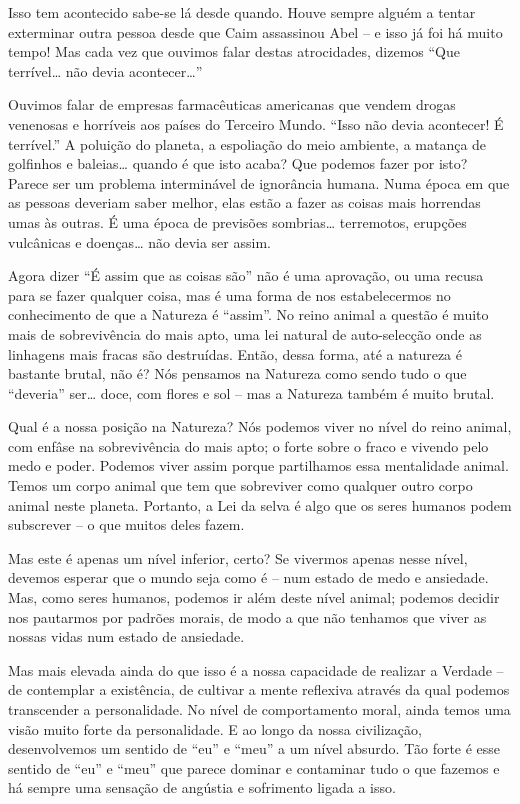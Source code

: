 Isso tem acontecido sabe-se lá desde quando. Houve sempre alguém a tentar
exterminar outra pessoa desde que Caim assassinou Abel -- e isso já foi há muito
tempo! Mas cada vez que ouvimos falar destas atrocidades, dizemos ``Que
terrível\ldots{} não devia acontecer\ldots{}''

Ouvimos falar de empresas farmacêuticas americanas que vendem drogas venenosas e
horríveis aos países do Terceiro Mundo. ``Isso não devia acontecer! É
terrível.'' A poluição do planeta, a espoliação do meio ambiente, a matança de
golfinhos e baleias\ldots{} quando é que isto acaba? Que podemos fazer por isto?
Parece ser um problema interminável de ignorância humana. Numa época em que as
pessoas deveriam saber melhor, elas estão a fazer as coisas mais horrendas umas
às outras. É uma época de previsões sombrias\ldots{} terremotos, erupções
vulcânicas e doenças\ldots{} não devia ser assim.

Agora dizer ``É assim que as coisas são'' não é uma aprovação, ou uma recusa
para se fazer qualquer coisa, mas é uma forma de nos estabelecermos no
conhecimento de que a Natureza é ``assim''. No reino animal a questão é muito
mais de sobrevivência do mais apto, uma lei natural de auto-selecção onde as
linhagens mais fracas são destruídas. Então, dessa forma, até a natureza é
bastante brutal, não é? Nós pensamos na Natureza como sendo tudo o que
``deveria'' ser\ldots{} doce, com flores e sol -- mas a Natureza também é muito
brutal.

Qual é a nossa posição na Natureza? Nós podemos viver no nível do reino animal,
com enfâse na sobrevivência do mais apto; o forte sobre o fraco e vivendo pelo
medo e poder. Podemos viver assim porque partilhamos essa mentalidade animal.
Temos um corpo animal que tem que sobreviver como qualquer outro corpo animal
neste planeta. Portanto, a Lei da selva é algo que os seres humanos podem
subscrever -- o que muitos deles fazem.

Mas este é apenas um nível inferior, certo? Se vivermos apenas nesse nível,
devemos esperar que o mundo seja como é -- num estado de medo e ansiedade. Mas,
como seres humanos, podemos ir além deste nível animal; podemos decidir nos
pautarmos por padrões morais, de modo a que não tenhamos que viver as nossas
vidas num estado de ansiedade.

Mas mais elevada ainda do que isso é a nossa capacidade de realizar a Verdade --
de contemplar a existência, de cultivar a mente reflexiva através da qual
podemos transcender a personalidade. No nível de comportamento moral, ainda
temos uma visão muito forte da personalidade. E ao longo da nossa civilização,
desenvolvemos um sentido de ``eu'' e ``meu'' a um nível absurdo. Tão forte é
esse sentido de ``eu'' e ``meu'' que parece dominar e contaminar tudo o que
fazemos e há sempre uma sensação de angústia e sofrimento ligada a isso.

